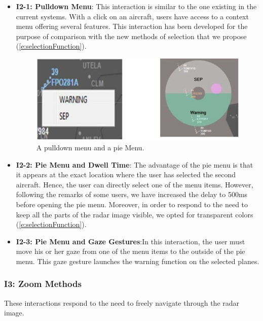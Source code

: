 \begin{itemize}

\item \textbf{I2-1: Pulldown Menu}: This interaction is similar to the one existing in the current
systems. With a click on an aircraft, users have access to a
context menu offering several features. This interaction has
been developed for the purpose of comparison with the new
methods of selection that we propose (\autoref{e:selectionFunction}).
\begin{figure}
 \centering
	\includegraphics[width=\textwidth]{Figures/selectionFunction.png}
	\caption{
	A pulldown menu and a pie Menu.}
	\label{e:selectionFunction}
\end{figure}

\item \textbf{I2-2: Pie Menu and Dwell Time}: The advantage of the pie menu is that it appears at the exact
location where the user has selected the second aircraft.
Hence, the user can directly select one of the menu items.
However, following the remarks of some users, we have
increased the delay to 500ms before opening the pie menu.
Moreover, in order to respond to the need to keep all the
parts of the radar image visible, we opted for transparent
colors (\autoref{e:selectionFunction}).

\item  \textbf{I2-3: Pie Menu and Gaze Gestures}:In this interaction, the user must move his or her gaze from one of the menu items to the outside of the pie menu. This gaze gesture launches the warning function on the selected planes.

\end{itemize}
 
\subsubsection{I3: Zoom Methods}
These interactions respond to the need to freely navigate
through the radar image.

